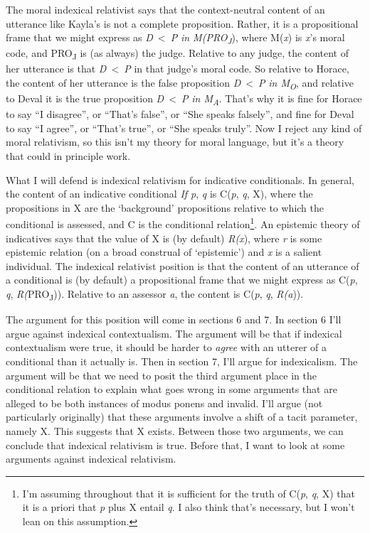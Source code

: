 The moral indexical relativist says that the context-neutral content of an utterance like Kayla's is not a complete proposition. Rather, it is a propositional frame that we might express as \textit{D}~{\textless}~\textit{P} \textit{in M(PRO}\textit{\textsubscript{J}}), where M(\textit{x}) is \textit{x}'s moral code, and PRO\textsubscript{J} is (as always) the judge. Relative to any judge, the content of her utterance is that \textit{D}~{\textless}~\textit{P} in that judge's moral code. So relative to Horace, the content of her utterance is the false proposition \textit{D}~{\textless}~\textit{P} \textit{in M}\textit{\textsubscript{O}}, and relative to Deval it is the true proposition \textit{D}~{\textless}~\textit{P} \textit{in M}\textit{\textsubscript{A}}. That's why it is fine for Horace to say ``I disagree'', or ``That's false'', or ``She speaks falsely'', and fine for Deval to say ``I agree'', or ``That's true'', or ``She speaks truly''. Now I reject any kind of moral relativism, so this isn't my theory for moral language, but it's a theory that could in principle work.

What I will defend is indexical relativism for indicative conditionals. In general, the content of an indicative conditional \textit{If p}, \textit{q} is C(\textit{p}, \textit{q}, X), where the propositions in X are the `background' propositions relative to which the conditional is assessed, and C is the conditional relation\footnote{ I'm assuming throughout that it is sufficient for the truth of C(\textit{p}, \textit{q}, X) that it is a priori that \textit{p} plus X entail \textit{q}. I also think that's necessary, but I won't lean on this assumption.}. An epistemic theory of indicatives says that the value of X is (by default) \textit{R(x}), where \textit{r} is some epistemic relation (on a broad construal of `epistemic') and \textit{x} is a salient individual. The indexical relativist position is that the content of an utterance of a conditional is (by default) a propositional frame that we might express as C(\textit{p}, \textit{q}, \textit{R(}PRO\textsubscript{J})). Relative to an assessor \textit{a}, the content is C(\textit{p}, \textit{q}, \textit{R(a})).

The argument for this position will come in sections 6 and 7. In section 6 I'll argue against indexical contextualism. The argument will be that if indexical contextualism were true, it should be harder to \textit{agree} with an utterer of a conditional than it actually is. Then in section 7, I'll argue for indexicalism. The argument will be that we need to posit the third argument place in the conditional relation to explain what goes wrong in some arguments that are alleged to be both instances of modus ponens and invalid. I'll argue (not particularly originally) that these arguments involve a shift of a tacit parameter, namely X. This suggests that X exists. Between those two arguments, we can conclude that indexical relativism is true. Before that, I want to look at some arguments against indexical relativism.

